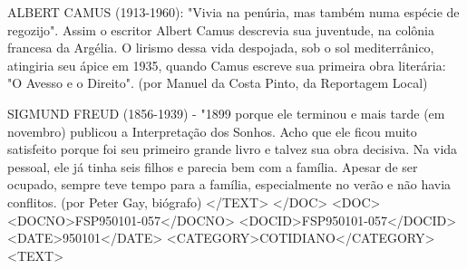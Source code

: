 ALBERT CAMUS (1913-1960): "Vivia na penúria, mas também numa espécie de regozijo". Assim o escritor Albert Camus descrevia sua juventude, na colônia francesa da Argélia. O lirismo dessa vida despojada, sob o sol mediterrânico, atingiria seu ápice em 1935, quando Camus escreve sua primeira obra literária: "O Avesso e o Direito". (por Manuel da Costa Pinto, da Reportagem Local)

SIGMUND FREUD (1856-1939) - "1899 porque ele terminou e mais tarde (em novembro) publicou a Interpretação dos Sonhos. Acho que ele ficou muito satisfeito porque foi seu primeiro grande livro e talvez sua obra decisiva. Na vida pessoal, ele já tinha seis filhos e parecia bem com a família. Apesar de ser ocupado, sempre teve tempo para a família, especialmente no verão e não havia conflitos. (por Peter Gay, biógrafo)
</TEXT>
</DOC>
<DOC>
<DOCNO>FSP950101-057</DOCNO>
<DOCID>FSP950101-057</DOCID>
<DATE>950101</DATE>
<CATEGORY>COTIDIANO</CATEGORY>
<TEXT>

